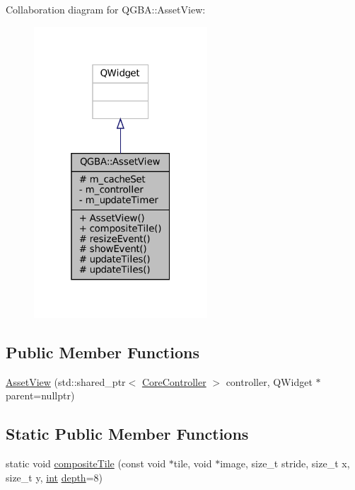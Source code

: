 Collaboration diagram for Q\+G\+BA\+:\+:Asset\+View\+:
\nopagebreak
\begin{figure}[H]
\begin{center}
\leavevmode
\includegraphics[width=184pt]{class_q_g_b_a_1_1_asset_view__coll__graph}
\end{center}
\end{figure}
\subsection*{Public Member Functions}
\begin{DoxyCompactItemize}
\item 
\mbox{\hyperlink{class_q_g_b_a_1_1_asset_view_a106d5c6432f8745e8d331760704e3619}{Asset\+View}} (std\+::shared\+\_\+ptr$<$ \mbox{\hyperlink{class_q_g_b_a_1_1_core_controller}{Core\+Controller}} $>$ controller, Q\+Widget $\ast$parent=nullptr)
\end{DoxyCompactItemize}
\subsection*{Static Public Member Functions}
\begin{DoxyCompactItemize}
\item 
static void \mbox{\hyperlink{class_q_g_b_a_1_1_asset_view_aea61abdd1cef7db1227c8ebfc1c29f58}{composite\+Tile}} (const void $\ast$tile, void $\ast$image, size\+\_\+t stride, size\+\_\+t x, size\+\_\+t y, \mbox{\hyperlink{ioapi_8h_a787fa3cf048117ba7123753c1e74fcd6}{int}} \mbox{\hyperlink{rpng2-x_8c_acb5ba97551079e0b072c62c21d784ac5}{depth}}=8)
\end{DoxyCompactItemize}
